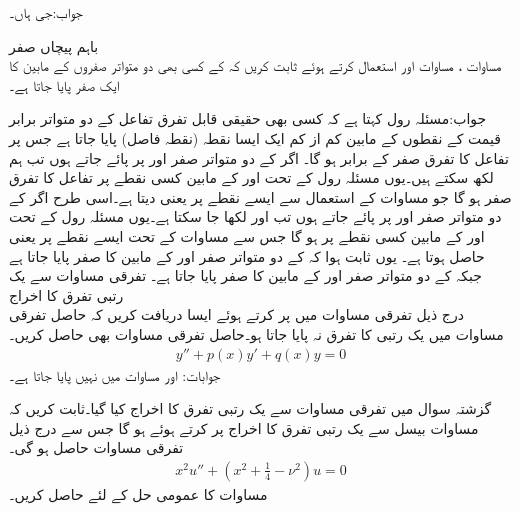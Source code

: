 جواب:جی ہاں۔

\quad باہم پیچاں صفر\\
مساوات ، مساوات  اور  استعمال کرتے ہوئے ثابت کریں کہ  کے کسی بھی دو متواتر صفروں کے مابین  کا ایک صفر پایا جاتا ہے۔ 

جواب:مسئلہ رول کہتا ہے کہ کسی بھی حقیقی قابل تفرق تفاعل کے دو متواتر برابر قیمت کے نقطوں کے مابین کم از کم ایک ایسا نقطہ (نقطہ فاصل) پایا جاتا ہے جس پر تفاعل کا تفرق صفر کے برابر ہو گا۔ اگر  کے دو متواتر صفر  اور  پر پائے جاتے ہوں تب ہم  لکھ سکتے ہیں۔یوں مسئلہ رول کے تحت  اور  کے مابین کسی نقطے پر تفاعل  کا تفرق صفر  ہو گا جو مساوات  کے استعمال سے ایسے نقطے پر  یعنی  دیتا ہے۔اسی طرح اگر  کے دو متواتر صفر  اور  پر پائے جاتے ہوں تب  اور  لکھا جا سکتا ہے۔یوں مسئلہ رول کے تحت  اور  کے مابین کسی نقطے پر  ہو گا جس سے مساوات  کے تحت ایسے نقطے پر  یعنی  حاصل ہوتا ہے۔ یوں  ثابت ہوا کہ  کے دو متواتر صفر  اور  کے مابین  کا صفر پایا جاتا ہے جبکہ  کے دو متواتر صفر  اور  کے مابین  کا صفر پایا جاتا ہے۔
\quad تفرقی مساوات سے یک رتبی تفرق کا اخراج\\
 درج ذیل تفرقی مساوات میں  پر کرتے ہوئے ایسا  دریافت کریں کہ حاصل تفرقی مساوات میں یک رتبی کا تفرق نہ پایا جاتا ہو۔حاصل تفرقی مساوات بھی حاصل کریں۔
\begin{align*}
y''+p(x)y'+q(x)y=0
\end{align*}
جوابات: اور مساوات  میں  نہیں پایا جاتا ہے۔

گزشتہ سوال میں تفرقی مساوات سے یک رتبی تفرق کا اخراج کیا گیا۔ثابت کریں کہ مساوات بیسل  سے یک رتبی تفرق کا اخراج  پر کرتے ہوئے ہو گا جس سے درج ذیل تفرقی مساوات حاصل ہو گی۔
\begin{align}\label{مساوات_بیسل_سادہ_صورت}
x^2u''+(x^2+\tfrac{1}{4}-\nu^2)u=0
\end{align}
مساوات  کا عمومی حل  کے لئے حاصل کریں۔

